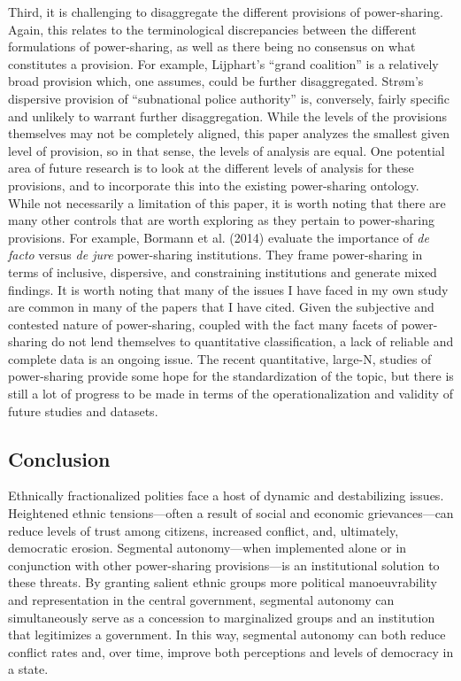 \documentclass[12pt]{article}
\begin{document}
Third, it is challenging to disaggregate the different provisions of power-sharing. Again, this relates to the terminological discrepancies between the different formulations of power-sharing, as well as there being no consensus on what constitutes a provision. For example, Lijphart’s ``grand coalition'' is a relatively broad provision which, one assumes, could be further disaggregated. Strøm’s dispersive provision of ``subnational police authority'' is, conversely, fairly specific and unlikely to warrant further disaggregation. While the levels of the provisions themselves may not be completely aligned, this paper analyzes the smallest given level of provision, so in that sense, the levels of analysis are equal. One potential area of future research is to look at the different levels of analysis for these provisions, and to incorporate this into the existing power-sharing ontology. While not necessarily a limitation of this paper, it is worth noting that there are many other controls that are worth exploring as they pertain to power-sharing provisions. For example, Bormann et al. (2014) evaluate the importance of \textit{de facto} versus \textit{de jure} power-sharing institutions. They frame power-sharing in terms of inclusive, dispersive, and constraining institutions and generate mixed findings. It is worth noting that many of the issues I have faced in my own study are common in many of the papers that I have cited. Given the subjective and contested nature of power-sharing, coupled with the fact many facets of power-sharing do not lend themselves to quantitative classification, a lack of reliable and complete data is an ongoing issue. The recent quantitative, large-N, studies of power-sharing provide some hope for the standardization of the topic, but there is still a lot of progress to be made in terms of the operationalization and validity of future studies and datasets.  

\subsection{Conclusion}
Ethnically fractionalized polities face a host of dynamic and destabilizing issues. Heightened ethnic tensions---often a result of social and economic grievances---can reduce levels of trust among citizens, increased conflict, and, ultimately, democratic erosion. Segmental autonomy---when implemented alone or in conjunction with other power-sharing provisions---is an institutional solution to these threats. By granting salient ethnic groups more political manoeuvrability and representation in the central government, segmental autonomy can simultaneously serve as a concession to marginalized groups and an institution that legitimizes a government. In this way, segmental autonomy can both reduce conflict rates and, over time, improve both perceptions and levels of democracy in a state.  
\end{document}
